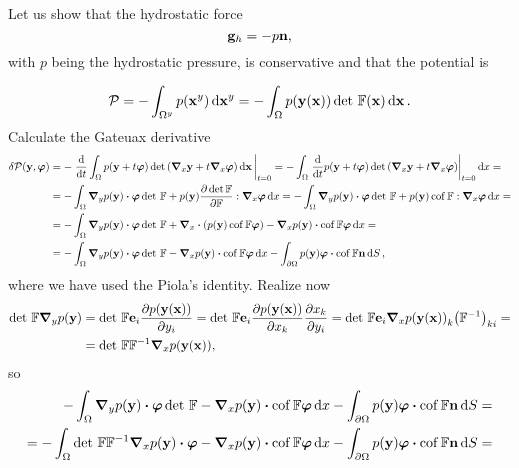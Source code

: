 \documentclass[11pt]{scrartcl} %
\begin{document}
    \begin{example}
        Let us show that the hydrostatic force
	\[
		\vb{g}_h = -p \vb{n},
	\]
	with $p$ being the hydrostatic pressure, is conservative and that the potential is 

	\[
		\mathcal{P} = -\int_{\Omega^{y}}p\qty(\vb{x}^{y})\dd{\vb{x}^{y}} = - \int_{\Omega}p\qty(\vb{y}\qty(\vb{x}))\det\, \mathbb{F}\qty(\vb{x})\dd{\vb{x}}.
	\]
	Calculate the Gateuax derivative 
	\begin{align*}
		\delta \mathcal{P}\qty(\vb{y}, \vb*{\varphi}) &= -\eval{\dv{t} \int_{\Omega}p\qty(\vb{y}+ t \vb*{\varphi}) \det\qty(\grad_x \vb{y} + t \grad_x \vb*{\varphi})\dd{\vb{x}}}_{t=0} = - \int_{\Omega}\eval{\dv{t} p\qty(\vb{y}+ t \vb*{\varphi})  \det \qty(\grad_x \vb{y} + t \grad_x \vb*{\varphi})}_{t=0}\dd{x} =\\
							      &=- \int_{\Omega}\grad_y p\qty(\vb{y})\vdot \vb*{\varphi} \detf + p\qty(\vb{y})\pdv{\det \fgrad}{\fgrad} : \grad_x \vb*{\varphi} \dd{x} = - \int_{\Omega}\grad_y p\qty(\vb{y})\vdot \vb*{\varphi} \detf + p\qty(\vb{y})\cof \fgrad : \grad_x \vb*{\varphi} \dd{x} =\\
							      &= -\int_{\Omega}\grad_y p\qty(\vb{y}) \vdot \vb*{\varphi} \detf + \grad_x \vdot\qty(p\qty(\vb{y}) \cof \fgrad \vb*{\varphi}) - \grad_x p\qty(\vb{y}) \vdot \cof \fgrad \vb*{\varphi}\dd{x} =\\
							      &=- \int_{\Omega}\grad_y p\qty(\vb{y}) \vdot \vb*{\varphi} \detf - \grad_x p\qty(\vb{y}) \vdot \cof \fgrad \vb*{\varphi}\dd{x} - \int_{\partial \Omega}p\qty(\vb{y})\vb*{\varphi} \vdot \cof \fgrad \vb{n} \dd{S},
	\end{align*}
	where we have used the Piola's identity. Realize now
	\begin{align*}
		\det\, \mathbb{F} \grad_y p\qty(\vb{y}) &= \det\, \mathbb{F} \vb{e}_i \pdv{p\qty(\vb{y}(\vb{x}))}{y_i} = \det\, \mathbb{F} \vb{e}_i \pdv{p\qty(\vb{y}\qty(\vb{x}))}{x_k}\pdv{x_k}{y_i} = \det\, \mathbb{F} \vb{e}_i \grad_x p\qty(\vb{y}\qty(\vb{x}))_k \qty(\mathbb{F}^{-1})_{ki} =\\
		&=\det\, \mathbb{F} \mathbb{F}^{-1} \grad_x p\qty(\vb{y}\qty(\vb{x})), 
	\end{align*}
	so
	\begin{align*}
		- \int_{\Omega}\grad_y p\qty(\vb{y}) \vdot \vb*{\varphi} \detf - \grad_x p\qty(\vb{y}) \vdot \cof \fgrad \vb*{\varphi}\dd{x} &- \int_{\partial \Omega}p\qty(\vb{y})\vb*{\varphi} \vdot \cof \fgrad \vb{n} \dd{S} = \\
		=- \int_{\Omega}\detf \inverse{\fgrad} \grad_x p\qty(\vb{y}) \vdot \vb*{\varphi} - \grad_x p\qty(\vb{y}) \vdot \cof \fgrad \vb*{\varphi}\dd{x} &- \int_{\partial \Omega}p\qty(\vb{y}) \vb*{\varphi} \vdot \cof \fgrad \vb{n}\dd{S} = \\

\end{align*}
\end{example}
\end{document}
